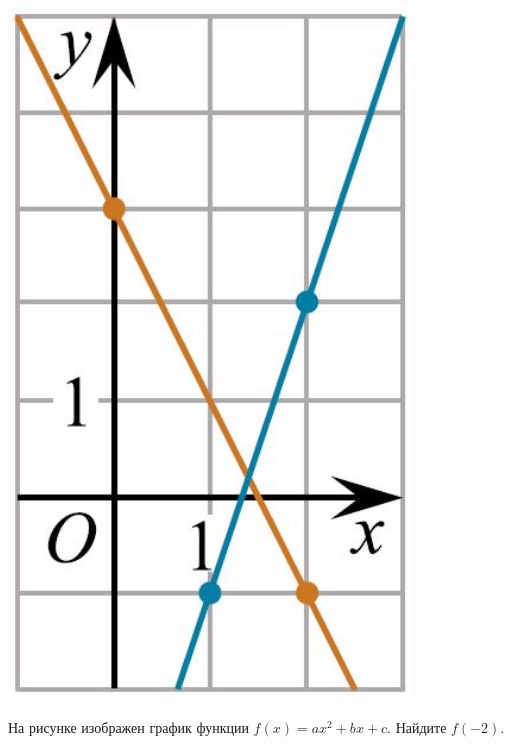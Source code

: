 \begin{listofex}
\begin{minipage}[c]{0.2\textwidth}
		\includegraphics[align=t, width=0.8\textwidth]{pics/G113M3C7-2}
	\end{minipage}
	\item
	\begin{minipage}[t]{0.57\textwidth}
		На рисунке изображен график функции \( f(x)=ax^2+bx+c \). Найдите \( f(-2) \).
	\end{minipage}
	\begin{minipage}[c]{0.3\textwidth}

\end{minipage}
\end{listofex}
